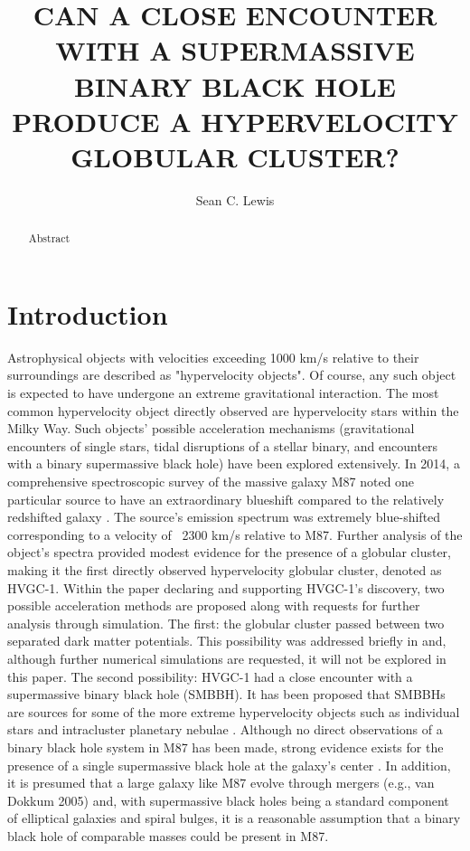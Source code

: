 \documentclass{aastex62}
\begin{document}
\title{CAN A CLOSE ENCOUNTER WITH A SUPERMASSIVE BINARY BLACK HOLE PRODUCE A HYPERVELOCITY GLOBULAR CLUSTER?}

\author{Sean C. Lewis}



\begin{abstract}

Abstract

\end{abstract}
\section{Introduction} \label{sec:intro}
Astrophysical objects with velocities exceeding 1000 km/s relative to their surroundings are described as  "hypervelocity objects". Of course, any such object is expected to have undergone an extreme gravitational interaction. The most common hypervelocity object directly observed are hypervelocity stars within the Milky Way.  Such objects' possible acceleration mechanisms (gravitational encounters of single stars, tidal disruptions of a stellar binary, and encounters with a binary supermassive black hole) have been explored extensively. In 2014, a comprehensive spectroscopic survey of the massive galaxy M87 noted one particular source to have an extraordinary blueshift compared to the relatively redshifted galaxy \citep{cald14}. The source's emission spectrum was extremely blue-shifted corresponding to a velocity of ~2300 km/s relative to M87. Further analysis of the object's spectra provided modest evidence for the presence of a globular cluster, making it the first directly observed hypervelocity globular cluster, denoted as HVGC-1. Within the paper declaring and supporting HVGC-1's discovery, two possible acceleration methods are proposed along with requests for further analysis through simulation. The first: the globular cluster passed between two separated dark matter potentials. This possibility was addressed briefly in \citet{sam15} and, although further numerical simulations are requested, it will not be explored in this paper. The second possibility: HVGC-1 had a close encounter with a supermassive binary black hole  (SMBBH). It has been proposed that SMBBHs are sources for some of the more extreme hypervelocity objects such as individual stars \citep{yutre03} and intracluster planetary nebulae \citep{hol05}. Although no direct observations of a binary black hole system in M87 has been made, strong evidence exists for the presence of a single supermassive black hole at the galaxy's center \citep{geb11}. In addition, it is presumed that a large galaxy like M87 evolve through mergers (e.g., van Dokkum 2005) and, with supermassive black holes being a standard component of elliptical galaxies and spiral bulges, it is a reasonable assumption that a binary black hole of comparable masses could be present in M87. 
\end{document}
